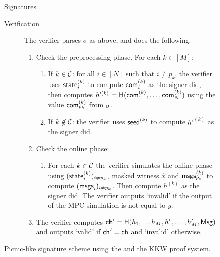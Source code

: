 \begin{figure}[p]
\begin{minipage}[t]{1.1\textwidth}
\begin{protocolbox}{\ttOWF Signatures}
\begin{description}
    \item[Verification] The verifier parses $\sigma$ as above, and does the following.  
    \begin{enumerate}
        \item Check the preprocessing phase. For each $k\in[M]$:
        \begin{enumerate}
        \item If $k \in \mathcal{C}$: for all $i\in[N]$  such that $i \neq p_k$, the verifier uses $\textsf{state}^{(k)}_{i}$ to compute $\textsf{com}^{(k)}_{i}$ as 
            the signer did, then computes $h'^{(k)} = \textsf{H}(\textsf{com}^{(k)}_{1},\ldots,\textsf{com}^{(k)}_{N})$ using 
            the value $\textsf{com}^{(k)}_{p_k}$ from $\sigma$. 
        \item If $k\not\in\mathcal{C}$: the verifier uses $\textsf{seed}^{(k)}$ to compute $h'^{(k)}$ as the signer did.
        \end{enumerate} 
        
        \item Check the online phase:
        \begin{enumerate}
            \item For each $k \in \mathcal{C}$ the verifier simulates the online phase using $(\textsf{state}^{(k)}_{i})_{i \neq p_k}$,  
                masked witness $\hat{x}$ and $\textsf{msgs}^{(k)}_{p_k}$ to compute $(\textsf{msgs}_i)_{i \neq p_k}$. 
                Then compute $h^{(k)}$ as the signer did. The verifier outputs `invalid' if the output of the MPC simulation is not equal to $y$.
        \end{enumerate}
    \item The verifier computes $\textsf{ch}' = \textsf{H}(h_1, \ldots h_M, h_1', \ldots, h_M', \textsf{Msg})$ and outputs `valid' if $\textsf{ch}' = \textsf{ch}$ and `invalid' otherwise. 
    \end{enumerate}
 \end{description}
 \end{protocolbox}
 \end{minipage}
	\vspace*{-10pt}
	\caption{\label{fig:23-picnic}Picnic-like signature scheme using the \ttOWF and the KKW proof system.} 
\end{figure}




